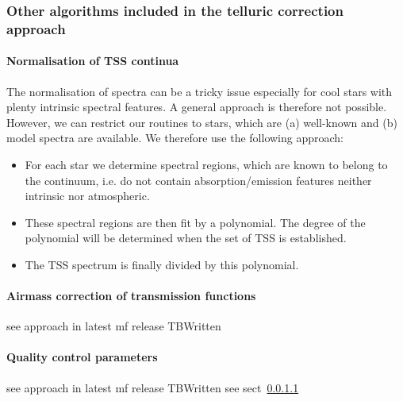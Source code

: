 \subsubsection{Other algorithms included in the telluric correction approach}\label{ssec:otheralgstellcorr}
\paragraph{Normalisation of \ac{TSS} continua\newline}\label{ssec:spec_normalisation}
The normalisation of spectra can be a tricky issue especially for cool stars with plenty intrinsic spectral features. A general approach is therefore not possible. However, we can restrict our routines to stars, which are (a) well-known and (b) model spectra are available. We therefore use the following approach: 
\begin{itemize}
    \item For each star we determine spectral regions, which are known to belong to the continuum, i.e. do not contain absorption/emission features neither intrinsic nor atmospheric.
    \item These spectral regions are then fit by a polynomial. The degree of the polynomial will be determined when the set of \ac{TSS} is established.
    \item The \ac{TSS} spectrum is finally divided by this polynomial.
\end{itemize} 

\paragraph{Airmass correction of transmission functions\newline}\label{ssec:airmass_corr}
see approach in latest mf release TBWritten

\paragraph{Quality control parameters\newline}\label{ssec_tellcorr_qc_params}
see approach in latest mf release TBWritten see sect~\ref{ssec:spec_normalisation}